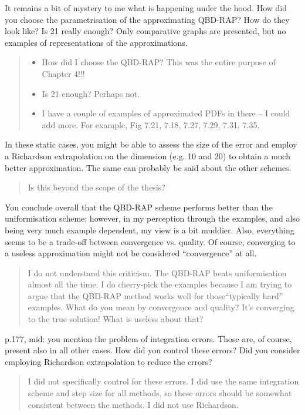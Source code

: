 \documentclass[a4paper]{article}
\begin{document}
It remains a bit of mystery to me what is happening under the hood. How did you choose the parametrisation of the approximating QBD-RAP? How do they look like? Is 21 really enough? Only comparative graphs are presented, but no examples of representations of the approximations.
\begin{quote}
    \begin{itemize}
        \item How did I choose the QBD-RAP? This was the entire purpose of Chapter 4!!! 
        \item Is 21 enough? Perhaps not.
        \item I have a couple of examples of approximated PDFs in there -- I could add more. For example, Fig 7.21, 7.18, 7.27, 7.29, 7.31, 7.35. 
    \end{itemize}
\end{quote}

In these static cases, you might be able to assess the size of the error and employ a Richardson extrapolation on the dimension (e.g. 10 and 20) to obtain a much better approximation. The same can probably be said about the other schemes.
\begin{quote}
    Is this beyond the scope of the thesis? 
\end{quote}

You conclude overall that the QBD-RAP scheme performs better than the uniformisation scheme; however, in my perception through the examples, and also being very much example dependent, my view is a bit muddier. Also, everything seems to be a trade-off between convergence vs. quality. Of course, converging to a useless approximation might not be considered “convergence” at all.
\begin{quote}
    I do not understand this criticism. The QBD-RAP beats uniformisation almost all the time. I do cherry-pick the examples because I am trying to argue that the QBD-RAP method works well for those``typically hard'' examples. What do you mean by convergence and quality? It's converging to the true solution! What is useless about that?
\end{quote}

p.177, mid: you mention the problem of integration errors. Those are, of course, present also in all other cases. How did you control these errors? Did you consider employing Richardson extrapolation to reduce the errors?
\begin{quote}
    I did not specifically control for these errors. I did use the same integration scheme and step size for all methods, so these errors should be somewhat consistent between the methods. I did not use Richardson. 
\end{quote}
\end{document}
